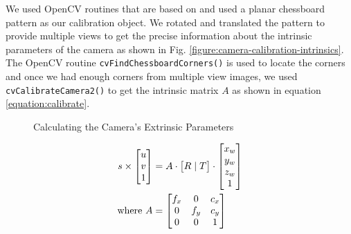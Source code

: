 We used OpenCV routines that are based on \cite{zhang:2000} \cite{brown:1971}
and used a planar chessboard pattern as our calibration object. We rotated and
translated the pattern to provide multiple views to get the precise
information about the intrinsic parameters of the camera as shown in Fig.
\ref{figure:camera-calibration-intrinsics}.  The OpenCV routine
\texttt{cvFindChessboardCorners()} is used to locate the corners and once we
had enough corners from multiple view images, we used
\texttt{cvCalibrateCamera2()} to get the intrinsic matrix $A$ as shown in
equation \ref{equation:calibrate}.

\begin{figure}[ht!]
\centering
{} \quad
{}
\caption{Calculating the Camera's Extrinsic Parameters}
\label{figure:camera-calibration-extrinsics}
\end{figure}

\begin{align}
	\label{equation:calibrate}
	s \times
	\begin{bmatrix}
		u \\ v \\	1 \\
	\end{bmatrix} &= A \cdot \begin{bmatrix}
															R \mid T
	 				  								\end{bmatrix}
										 \cdot \begin{bmatrix}
															x_w \\ y_w \\ z_w \\ 1
														\end{bmatrix} \\
	\text{where}~
	A &= \begin{bmatrix}
					f_x & 0 & c_x \\
					0 & f_y & c_y \\
					0 & 0 & 1 \\
 		 	 \end{bmatrix} \notag
\end{align}

